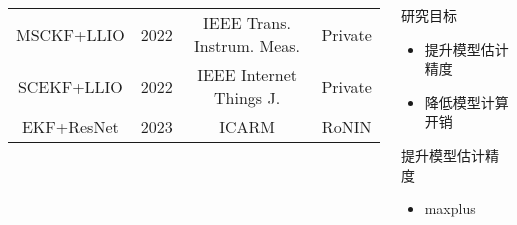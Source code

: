 \begin{frame}
\begin{columns}[t]
\begin{column}{0.5\textwidth}
{\begin{tabular*}{\linewidth}{@{\extracolsep{\fill}}cccc}
				               MSCKF+LLIO & 2022 & IEEE Trans. Instrum. Meas.      & Private                  \\ %
				               SCEKF+LLIO & 2022 & IEEE Internet Things J.         & Private                  \\ %
				               EKF+ResNet & 2023 & ICARM                           & RoNIN                    \\ %
				\bottomrule
			\end{tabular*}          
		}
		\end{column}   
		\begin{column}{0.5\textwidth}
		    \begin{block}{研究目标}
				\begin{itemize}
					\item 提升模型估计精度
					\item 降低模型计算开销
				\end{itemize}
			\end{block}
			\begin{block}{提升模型估计精度}
				\begin{itemize}
					\item maxplus
				\end{itemize}
			\end{block}
		\end{column}
	\end{columns}	
\end{frame}

